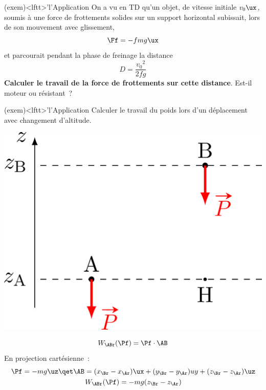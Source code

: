 \documentclass[../../main/main.tex]{subfiles}
\begin{document}
\begin{tcb*}(exem)<lftt>'l'{Application}
	On a vu en TD qu'un objet, de vitesse initiale $v_0\ux$, soumis à une force
	de frottements solides sur un support horizontal subissait, lors de son
	mouvement avec glissement,
	\[\Ff = -fmg\ux\]
	et parcourait pendant la phase de freinage la distance
	\[D = \frac{v_0{}^2}{2fg}\]
	\textbf{Calculer le travail de la force de frottements sur cette distance}.
	Est-il moteur ou résistant~?
	\tcblower
\end{tcb*}

\begin{tcb*}(exem)<lftt>'l'{Application}
	Calculer le travail du poids lors d'un déplacement avec changement
	d'altitude.
	\tcblower
	\begin{minipage}{0.20\linewidth}
		\begin{center}
			\includegraphics[width=\linewidth]{w_p}
		\end{center}
	\end{minipage}
	\hfill
	\begin{minipage}{.75\linewidth}
		\[W_{\ABr}(\Pf) = \Pf\cdot\AB\]
		En projection cartésienne~:
		\begin{gather*}
			\Pf = -mg\uz
			\qet
			\AB = (x_\Br-x_\Ar)\ux + (y_\Br - y_\Ar)uy + (z_\Br - z_\Ar)\uz
			\\
			W_{\ABr}(\Pf) = -mg(z_\Br - z_\Ar)
		\end{gather*}
	\end{minipage}
\end{tcb*}
\end{document}

